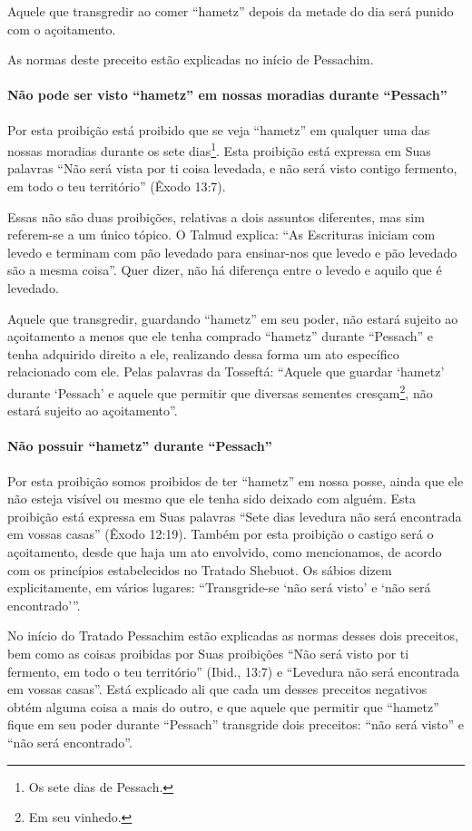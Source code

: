 Aquele que transgredir ao comer ``hametz'' depois da metade do dia será
punido com o açoitamento.

As normas deste preceito estão explicadas no início de Pessachim.

\paragraph{Não pode ser visto ``hametz'' em nossas moradias durante ``Pessach''}

Por esta proibição está proibido que se veja ``hametz'' em qualquer uma
das nossas moradias durante os sete dias\footnote{Os sete dias de Pessach.}. Esta
proibição está expressa em Suas palavras ``Não será vista por ti coisa
levedada, e não será visto contigo fermento, em todo o teu território''
(Êxodo 13:7).

Essas não são duas proibições, relativas a dois assuntos diferentes, mas
sim referem-se a um único tópico. O Talmud explica: ``As Escrituras
iniciam com levedo e terminam com pão levedado para ensinar-nos que
levedo e pão levedado são a mesma coisa''. Quer dizer, não há diferença
entre o levedo e aquilo que é levedado.

Aquele que transgredir, guardando ``hametz'' em seu poder, não estará
sujeito ao açoitamento a menos que ele tenha comprado ``hametz''
durante ``Pessach'' e tenha adquirido direito a ele, realizando dessa
forma um ato específico relacionado com ele. Pelas palavras da
Tosseftá: ``Aquele que guardar `hametz' durante `Pessach' e aquele que
permitir que diversas sementes cresçam\footnote{Em seu vinhedo.}, não estará
sujeito ao açoitamento''.

\paragraph{Não possuir ``hametz'' durante ``Pessach''}

Por esta proibição somos proibidos de ter ``hametz'' em nossa posse,
ainda que ele não esteja visível ou mesmo que ele tenha sido deixado com
alguém. Esta proibição está expressa em Suas palavras ``Sete dias
levedura não será encontrada em vossas casas'' (Êxodo 12:19). Também por
esta proibição o castigo será o açoitamento, desde que haja um ato
envolvido, como mencionamos, de acordo com os princípios estabelecidos
no Tratado Shebuot. Os sábios dizem explicitamente, em vários lugares:
``Transgride-se `não será visto' e `não será encontrado'''.

No início do Tratado Pessachim estão explicadas as normas desses dois
preceitos, bem como as coisas proibidas por Suas proibições ``Não será
visto por ti fermento, em todo o teu território'' (Ibid., 13:7) e
``Levedura não será encontrada em vossas casas''. Está explicado ali que
cada um desses preceitos negativos obtém alguma coisa a mais do outro, e
que aquele que permitir que ``hametz'' fique em seu poder durante
``Pessach'' transgride dois preceitos: ``não será visto'' e ``não será
encontrado''.

